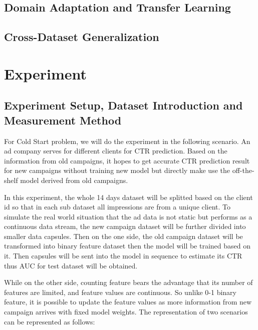 \documentclass{sig-alternate}
\begin{document}
\subsection{Domain Adaptation and Transfer Learning}
\subsection{Cross-Dataset Generalization}



\section{Experiment}

\subsection{Experiment Setup, Dataset Introduction and Measurement Method}

For Cold Start problem, we will do the experiment in the following scenario. An ad company serves for different clients for CTR prediction. Based on the information from old campaigns, it hopes to get accurate CTR prediction result for new campaigns without training new model but directly make use the off-the-shelf model derived from old campaigns. \vspace{5mm}

In this experiment, the whole 14 days dataset will be splitted based on the client id so that in each sub dataset all impressions are from a unique client. To simulate the real world situation that the ad data is not static but performs as a continuous data stream, the new campaign dataset will be further divided into smaller data capsules. Then on the one side, the old campaign dataset will be transformed into binary feature dataset then the model will be trained based on it. Then capsules will be sent into the model in sequence to estimate its CTR thus AUC for test dataset will be obtained. \vspace{5mm}

While on the other side, counting feature bears the advantage that its number of features are limited, and feature values are continuous. So unlike 0-1 binary feature, it is possible to update the feature values as more information from new campaign arrives with fixed model weights. The representation of two scenarios can be represented as follows:
\end{document}
